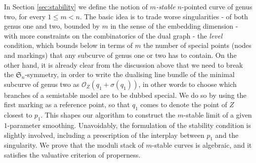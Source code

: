 \documentclass[11pt]{amsart}
\newcommand{\OO}{\mathcal O}
\theoremstyle{plain}
\theoremstyle{definition}
\begin{document}
In Section \ref{sec:stability} we define the notion of \emph{$m$-stable} $n$-pointed curve of genus two, for every $1\leq m<n$. The basic idea is to trade worse singularities - of both genus one and two, bounded by $m$ in the sense of the embedding dimension - with more constraints on the combinatorics of the dual graph - the \emph{level} condition, which bounds below in terms of $m$ the number of special points (nodes and markings) that any subcurve of genus one or two has to contain. On the other hand, it is already clear from the discussion above that we need to break the $\mathfrak S_n$-symmetry, in order to write the dualising line bundle of the minimal subcurve of genus two as $\OO_Z(q_1+\sigma(q_1))$, in other words to choose which branches of a semistable model are to be dubbed special. We do so by using the first marking as a reference point, so that $q_1$ comes to denote the point of $Z$ closest to $p_1$. This shapes our algorithm to construct the $m$-stable limit of a given $1$-parameter smoothing. Unavoidably, the formulation of the stability condition is slightly involved, including a prescription of the interplay between $p_1$ and the singularity. We prove that the moduli stack of $m$-stable curves is algebraic, and it satisfies the valuative criterion of properness.
\end{document}
